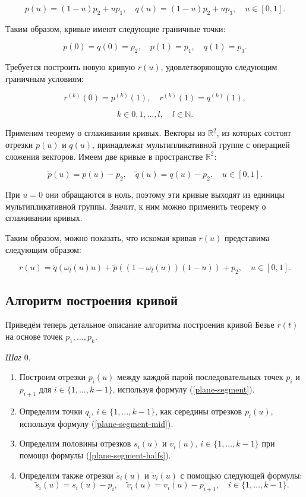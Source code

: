 $$
p(u)=(1-u)p_2+up_1, \quad q(u)=(1-u)p_2+up_3, \quad u \in [0,1].
$$

Таким образом, кривые имеют следующие граничные точки:

$$
p(0)=q(0)=p_2, \quad p(1)=p_1, \quad q(1)=p_3.
$$

Требуется построить новую кривую $r(u)$, удовлетворяющую следующим граничным условиям:

$$
r^{(k)}(0)=p^{(k)}(1), \quad r^{(k)}(1)=q^{(k)}(1),
$$

$$
k \in {0,1,\dots,l}, \quad l \in \mathbb{N}.
$$

Применим теорему о сглаживании кривых. Векторы из $\mathbb{R}^2$, из которых состоят отрезки $p(u)$ и $q(u)$,
принадлежат мультипликативной группе с операцией сложения векторов. Имеем две кривые в пространстве $\mathbb{R}^2$:

$$
\tilde p(u)=p(u)-p_2, \quad \tilde q(u)=q(u)-p_2, \quad u \in [0,1].
$$

При $u=0$ они обращаются в ноль, поэтому эти кривые выходят из единицы мультипликативной группы. Значит, к ним можно
применить теорему о сглаживании кривых.

Таким образом, можно показать, что искомая кривая $r(u)$ представима следующим образом:

$$
r(u)=\tilde q(\omega_l(u)u)+\tilde p((1-\omega_l(u))(1-u))+p_2, \quad u \in [0,1].
$$

\subsection*{Алгоритм построения кривой}

Приведём теперь детальное описание алгоритма построения кривой Безье $r(t)$ на основе точек $p_1,\dots,p_k$.

\bigskip
\textit{Шаг} 0.

\begin{enumerate}
\item Построим отрезки $p_i(u)$ между каждой парой последовательных точек $p_i$ и $p_{i+1}$ для
$i \in \{1,\dots,k-1\}$, используя формулу (\ref{plane-segment}).
\item Определим точки $q_i$, $i \in \{1,\dots,k-1\}$, как середины отрезков $p_i(u)$, используя формулу
(\ref{plane-segment-mid}).
\item Определим половины отрезков $s_i(u)$ и $v_i(u)$, $i \in \{1,\dots,k-1\}$ при помощи формулы
(\ref{plane-segment-halfs}).
\item Определим также отрезки $\tilde s_i(u)$ и $\tilde v_i(u)$ с помощью следующей формулы:
$$
\tilde s_i(u)=s_i(u)-p_i, \quad \tilde v_i(u)=v_i(u)-p_{i+1}, \quad i \in \{1,\dots,k-1\}.
$$
\end{enumerate}

